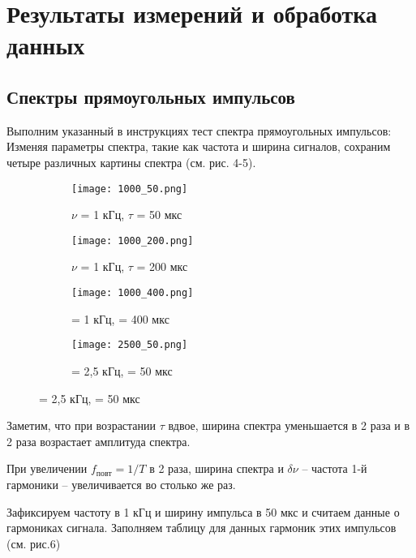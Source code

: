 \section{Результаты измерений и обработка данных}

\subsection{Спектры прямоугольных импульсов}

Выполним указанный в инструкциях тест спектра прямоугольных импульсов: Изменяя параметры спектра, такие как частота и ширина сигналов, сохраним четыре различных картины спектра (см. рис. 4-5).

\begin{figure}{\textwidth}
\begin{subfigure}{.5\textwidth}
    \centering
    \texttt{[image: 1000\_50.png]}
    \caption{$\nu$ = 1 кГц, $\tau$ = 50 мкс}
    \label{fig:table1}
\end{subfigure}%
\begin{subfigure}{.5\textwidth}
    \centering
    \texttt{[image: 1000\_200.png]}
    \caption{$\nu$ = 1 кГц, $\tau$ = 200 мкс}
    \label{fig:table1}
\end{subfigure}
\caption{}
\end{figure}

\begin{figure}{\textwidth}
\begin{subfigure}{.5\textwidth}
    \centering
    \texttt{[image: 1000\_400.png]}
    \caption{\nu = 1 кГц, \tau = 400 мкс}
    \label{fig:table1}
\end{subfigure}%
\begin{subfigure}{.5\textwidth}
    \centering
    \texttt{[image: 2500\_50.png]}
    \caption{\nu = 2,5 кГц, \tau = 50 мкс}
    \label{fig:table1}
\end{subfigure}
\end{figure}

Заметим, что при возрастании $ \tau $ вдвое, ширина спектра уменьшается в 2 раза и в 2 раза возрастает амплитуда спектра.

При увеличении $ f_{повт} = 1/T $ в 2 раза, ширина спектра и $ \delta \nu $ -- частота 1-й гармоники --  увеличивается во столько же раз.

Зафиксируем частоту в 1 кГц и ширину импульса в 50 мкс и считаем данные о гармониках сигнала.
Заполняем таблицу для данных гармоник этих импульсов (см. рис.6)

